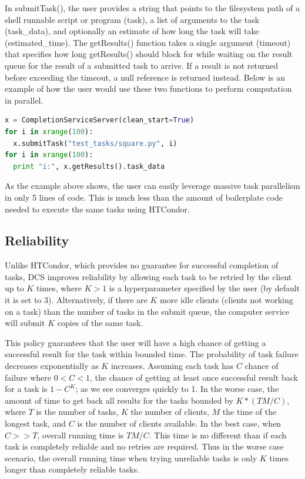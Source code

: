 \documentclass{article}
\begin{document}
In submitTask(), the user provides a string that points to the filesystem path of a shell runnable script or program (task), a list of arguments to the task (task\_data), and optionally an estimate of how long the task will take (estimated\_time). The getResults() function takes a single argument (timeout) that specifies how long getResults() should block for while waiting on the result queue for the result of a submitted task to arrive. If a result is not returned before exceeding the timeout, a null reference is returned instead. Below is an example of how the user would use these two functions to perform computation in parallel.

\begin{lstlisting}[language=Python]
x = CompletionServiceServer(clean_start=True)
for i in xrange(100):
  x.submitTask("test_tasks/square.py", i)
for i in xrange(100):
  print "i:", x.getResults().task_data
\end{lstlisting}

As the example above shows, the user can easily leverage massive task parallelism in only 5 lines of code. This is much less than the amount of boilerplate code needed to execute the same tasks using HTCondor.

\subsection{Reliability}

Unlike HTCondor, which provides no guarantee for successful completion of tasks, DCS improves reliability by allowing each task to be retried by the client up to $K$ times, where $K>1$ is a hyperparameter specified by the user (by default it is set to 3). Alternatively, if there are $K$ more idle clients (clients not working on a task) than the number of tasks in the submit queue, the computer service will submit $K$ copies of the same task.

This policy guarantees that the user will have a high chance of getting a successful result for the task within bounded time. The probability of task failure decreases exponentially as $K$ increases. Assuming each task has $C$ chance of failure where $0<C<1$, the chance of getting at least once successful result back for a task is $1-C^K$; as we see converges quickly to 1. In the worse case, the amount of time to get back all results for the tasks bounded by $K*(TM/C)$, where $T$ is the number of tasks, $K$ the number of clients, $M$ the time of the longest task, and $C$ is the number of clients available. In the best case, when $C>>T$, overall running time is $TM/C$. This time is no different than if each task is completely reliable and no retries are required. Thus in the worse case scenario, the overall running time when trying unreliable tasks is only $K$ times longer than completely reliable tasks.
\end{document}
